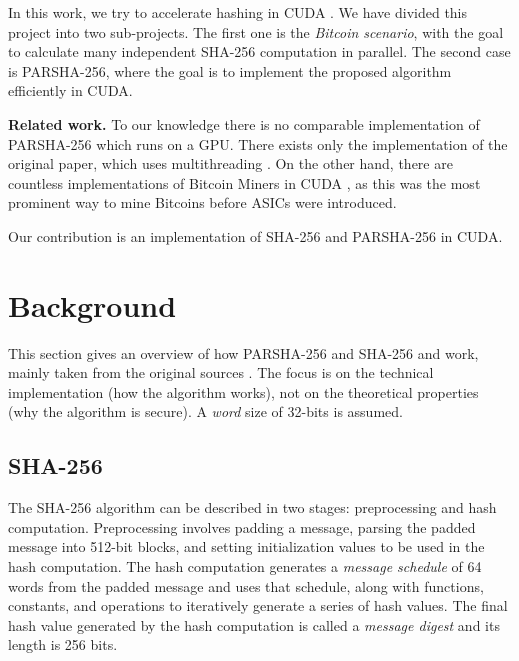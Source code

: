 \documentclass[letterpaper]{article}
\newcommand{\mypar}[1]{{\bf #1.}}
\begin{document}

In this work, we try to accelerate hashing in CUDA \cite{cuda}. We have divided this project into two sub-projects. The first one is the \emph{Bitcoin scenario}, with the goal  to calculate many independent SHA-256 computation in parallel. The second case is PARSHA-256, where the goal is to implement the proposed  algorithm efficiently in CUDA. 

\mypar{Related work} To our knowledge there is no comparable implementation of PARSHA-256 which runs on a GPU. There exists only the implementation of the original paper, which uses multithreading \cite{parsha256}. 
On the other hand, there are countless implementations of Bitcoin Miners in CUDA \cite{cbuchner,geedo}, as this was the most prominent way to mine Bitcoins before ASICs were introduced. 

Our contribution is an implementation of SHA-256 and PARSHA-256 in CUDA.

\section{Background}\label{sec:background}

This section gives an overview of how PARSHA-256 and SHA-256 and work, mainly taken from the original sources \cite{sha,parsha256}. The focus is on the technical implementation (how the algorithm works), not on the theoretical properties (why the algorithm is secure). A \emph{word} size of 32-bits is assumed.

\subsection{SHA-256 \cite{sha}}

The SHA-256 algorithm can be described in two stages: preprocessing and hash computation.  Preprocessing involves padding a message, parsing the padded message into 512-bit blocks, and setting initialization values to be used in the hash computation.  The hash computation generates a \emph{message schedule} of 64 words from the padded message and uses that schedule, along with functions, constants, and operations to iteratively generate a series of hash values.  The final hash value generated by the hash computation is called a \emph{message digest} and its length is 256 bits.\\
\end{document}
